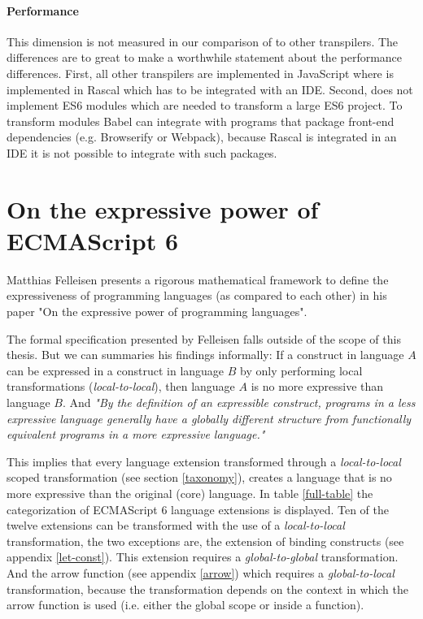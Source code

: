 \paragraph{Performance}
This dimension is not measured in our comparison of \projectname to other transpilers. The differences are to great to make a worthwhile statement about the performance differences. First, all other transpilers are implemented in JavaScript where \projectname is implemented in Rascal which has to be integrated with an IDE. Second, \projectname does not implement ES6 modules which are needed to transform a large ES6 project. To transform modules Babel can integrate with programs that package front-end dependencies (e.g. Browserify or Webpack), because Rascal is integrated in an IDE it is not possible to integrate with such packages.

\section{On the expressive power of ECMAScript 6}
Matthias Felleisen presents a rigorous mathematical framework to define the expressiveness of programming languages (as compared to each other) in his paper "On the expressive power of programming languages"\cite{Felleisen1990}.

The formal specification presented by Felleisen falls outside of the scope of this thesis. But we can summaries his findings informally: If a construct in language $A$ can be expressed in a construct in language $B$ by only performing local transformations (\textit{local-to-local}), then language $A$ is no more expressive than language $B$. And \textit{"By the definition of an expressible construct, programs in a less expressive language generally have a globally different structure from functionally equivalent programs in a more expressive language."}\cite{Felleisen1990}

This implies that every language extension transformed through a \textit{local-to-local} scoped transformation (see section \ref{taxonomy}), creates a language that is no more expressive than the original (core) language. In table \ref{full-table} the categorization of ECMAScript 6 language extensions is displayed. Ten of the twelve extensions can be transformed with the use of a \textit{local-to-local} transformation, the two exceptions are, the extension of binding constructs (see appendix \ref{let-const}). This extension requires a \textit{global-to-global} transformation. And the arrow function (see appendix \ref{arrow}) which requires a \textit{global-to-local} transformation, because the transformation depends on the context in which the arrow function is used (i.e. either the global scope or inside a function).

